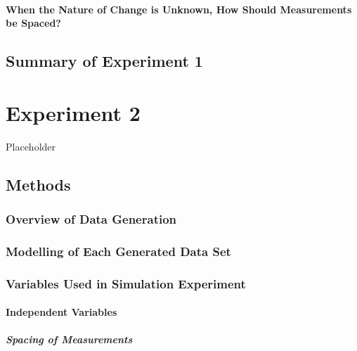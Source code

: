 \documentclass[
12pt, %
twoside,
english]{guelphthesis}
\begin{document}
\hypertarget{unknown}{%
\subsubsection{When the Nature of Change is Unknown, How Should Measurements be Spaced?}\label{unknown}}

\hypertarget{summary-of-experiment-1}{%
\section{Summary of Experiment 1}\label{summary-of-experiment-1}}

\hypertarget{Exp2}{%
\chapter{Experiment 2}\label{Exp2}}

Placeholder

\hypertarget{methods-1}{%
\section{Methods}\label{methods-1}}

\hypertarget{overview-of-data-generation}{%
\subsection{Overview of Data Generation}\label{overview-of-data-generation}}

\hypertarget{data-modelling-exp2}{%
\subsection{Modelling of Each Generated Data Set}\label{data-modelling-exp2}}

\hypertarget{variables-used-in-simulation-experiment-1}{%
\subsection{Variables Used in Simulation Experiment}\label{variables-used-in-simulation-experiment-1}}

\hypertarget{independent-variables-1}{%
\subsubsection{Independent Variables}\label{independent-variables-1}}

\hypertarget{spacing-of-measurements-1}{%
\paragraph{Spacing of Measurements}\label{spacing-of-measurements-1}}
\end{document}
